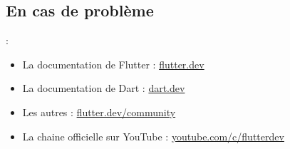 \documentclass[10pt]{beamer}
\begin{document}
\subsection{En cas de problème}
\begin{frame}[fragile,t]{\secname : \subsecname}
    \begin{itemize}
        \item La documentation de Flutter : \href{flutter.dev}{flutter.dev}
        \item La documentation de Dart : \href{dart.dev}{dart.dev}
        \item Les autres : \href{https://flutter.dev/community}{flutter.dev/community}
        \item La chaine officielle sur YouTube : \href{https://www.youtube.com/c/flutterdev/}{youtube.com/c/flutterdev}
    \end{itemize}
\end{frame}
\end{document}
